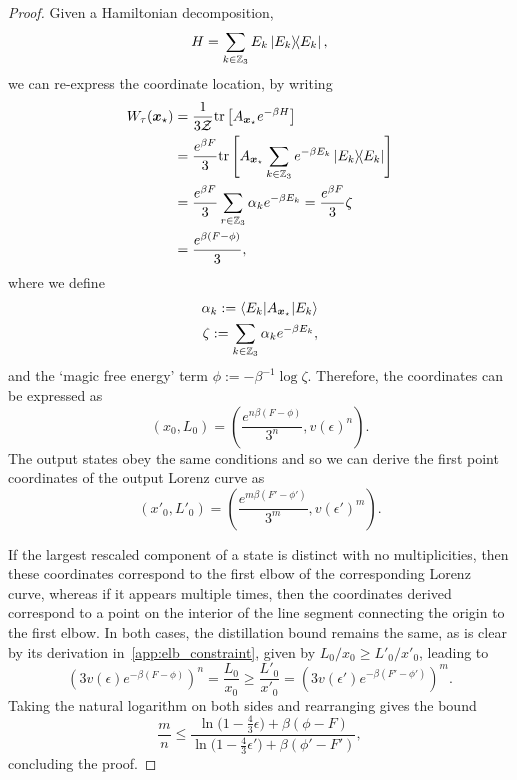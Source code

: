 \documentclass[pra,
aps,
twocolumn,
superscriptaddress,
groupedaddress,
nofootinbib,
reprint
]{revtex4-1}
\begin{document}
\begin{proof}
Given a Hamiltonian decomposition,
\begin{equation}
	H = \sum_{k \in \mathbb{Z}_3} E_k\ketbra{E_k}{E_k},
\end{equation}
we can re-express the coordinate location, by writing
\begin{align}
	W_{\tau}(\boldsymbol{x}_\star) &= \frac{1}{3\mathcal{Z}}\mbox{tr}\left[ A_{\boldsymbol{x}_\star}e^{-\beta H} \right] \nonumber\\
	&= \frac{e^{\beta F}}{3} \mbox{tr}\left[ A_{\boldsymbol{x}_\star}\sum_{k \in \mathbb{Z}_3} e^{-\beta E_k}\ketbra{E_k}{E_k} \right] \\
	&= \frac{e^{\beta F}}{3} \sum_{r \in \mathbb{Z}_3} \alpha_k e^{-\beta E_k}
	= \frac{e^{\beta F}}{3} \zeta \\
	&= \frac{e^{\beta (F - \phi)}}{3},
\end{align}
where we define
\begin{align}
\alpha_k := \langle E_k |A_{\boldsymbol{x}_\star} |E_k\rangle \\
\zeta :=  \sum_{k \in \mathbb{Z}_3} \alpha_k e^{-\beta E_k},
\end{align}
and the `magic free energy' term $\phi := -\beta^{-1} \log \zeta$.
Therefore, the coordinates can be expressed as
\begin{equation}
	(x_0, L_0) = \left( \frac{e^{n\beta (F - \phi)}}{3^n}, v(\epsilon)^n \right).
\end{equation}
The output states obey the same conditions and so we can derive the first point coordinates of the output Lorenz curve as
\begin{equation}
	(x'_0, L'_0) = \left( \frac{e^{m\beta (F' - \phi')}}{3^m}, v(\epsilon')^m \right).
\end{equation}

If the largest rescaled component of a state is distinct with no multiplicities, then these coordinates correspond to the first elbow of the corresponding Lorenz curve, whereas if it appears multiple times, then the coordinates derived correspond to a point on the interior of the line segment connecting the origin to the first elbow.
In both cases, the distillation bound remains the same, as is clear by its derivation in~\cref{app:elb_constraint}, given by $L_0/x_0 \geq L'_0/x'_0$, leading to
\begin{equation}
	\left( 3v(\epsilon)e^{-\beta (F - \phi)} \right)^{n} = \frac{L_0}{x_0}
	\geq \frac{L'_0}{x'_0} = \left( 3v(\epsilon')e^{-\beta (F' - \phi')} \right)^{m}.
\end{equation}
Taking the natural logarithm on both sides and rearranging gives the bound
\begin{equation}
	\frac{m}{n} \leq \dfrac{\ln{\big( 1-\frac{4}{3}\epsilon \big)} + \beta (\phi - F)}{\ln{\big( 1-\frac{4}{3}\epsilon' \big)} + \beta (\phi' - F')},
\end{equation}
concluding the proof.
\end{proof}
\end{document}
